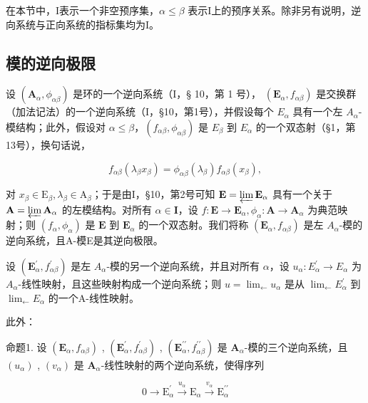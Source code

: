 在本节中，I表示一个非空预序集，\(\alpha \leqslant \beta\) 表示I上的预序关系。除非另有说明，逆向系统与正向系统的指标集均为I。

\subsection{模的逆向极限}

设 \((\mathbf{A}_{\alpha}, \phi_{\alpha\beta})\) 是环的一个逆向系统（I，§ 10，第 1 号）， \((\mathbf{E}_{\alpha}, f_{\alpha\beta})\) 是交换群（加法记法）的一个逆向系统（I，§10，第1号），并假设每个 \(E_{\alpha}\) 具有一个左 \(A_{\alpha}\)-模结构；此外，假设对 \(\alpha \leqslant \beta\)，\((f_{\alpha\beta}, \phi_{\alpha\beta})\) 是 \(E_{\beta}\) 到 \(E_{\alpha}\) 的一个双态射（§1，第13号），换句话说，

\[
f _ {\alpha \beta} (\lambda_ {\beta} x _ {\beta}) = \phi_ {\alpha \beta} (\lambda_ {\beta}) f _ {\alpha \beta} (x _ {\beta}),\tag{1}
\]

对 \(x_{\beta} \in \mathrm{E}_{\beta}, \lambda_{\beta} \in \mathrm{A}_{\beta}\)；于是由I，§10，第2号可知 \(\mathbf{E} = \varprojlim \mathbf{E}_{\alpha}\) 具有一个关于 \(\mathbf{A} = \varprojlim \mathbf{A}_{\alpha}\) 的左模结构。对所有 \(\alpha \in \mathbf{I}\)，设 \(f: \mathbf{E} \to \mathbf{E}_{\alpha}, \phi_{\alpha}: \mathbf{A} \to \mathbf{A}_{\alpha}\) 为典范映射；则 \((f_{\alpha}, \phi_{\alpha})\) 是 \(\mathbf{E}\) 到 \(\mathbf{E}_{\alpha}\) 的一个双态射。我们将称 \((\mathbf{E}_{\alpha}, f_{\alpha\beta})\) 是左 \(A_{\alpha}\)-模的逆向系统，且A-模E是其逆向极限。

设 \((\mathbf{E}_{\alpha}^{\prime}, f_{\alpha\beta}^{\prime})\) 是左 \(A_{\alpha}\)-模的另一个逆向系统，并且对所有 \(\alpha\)，设 \(u_{\alpha}: E_{\alpha}^{\prime} \to E_{\alpha}\) 为 \(A_{\alpha}\)-线性映射，且这些映射构成一个逆向系统；则 \(u = \lim_{\leftarrow} u_{\alpha}\) 是从 \(\lim_{\leftarrow} E_{\alpha}^{\prime}\) 到 \(\lim_{\leftarrow} E_{\alpha}\) 的一个A-线性映射。

此外：

命题1. 设 \((\mathbf{E}_{\alpha}, f_{\alpha\beta})\) , \((\mathbf{E}_{\alpha}^{\prime}, f_{\alpha\beta}^{\prime})\) , \((\mathbf{E}_{\alpha}^{\prime \prime}, f_{\alpha\beta}^{\prime \prime})\) 是 \(\mathbf{A}_{\alpha}\)-模的三个逆向系统，且 \((u_{\alpha})\) , \((v_{\alpha})\) 是 \(\mathbf{A}_{\alpha}\)-线性映射的两个逆向系统，使得序列

\[
0 \longrightarrow \mathrm{E} _ {\alpha} ^ {\prime} \stackrel {u _ {\alpha}} {\longrightarrow} \mathrm{E} _ {\alpha} \stackrel {v _ {\alpha}} {\longrightarrow} \mathrm{E} _ {\alpha} ^ {\prime \prime}
\]

